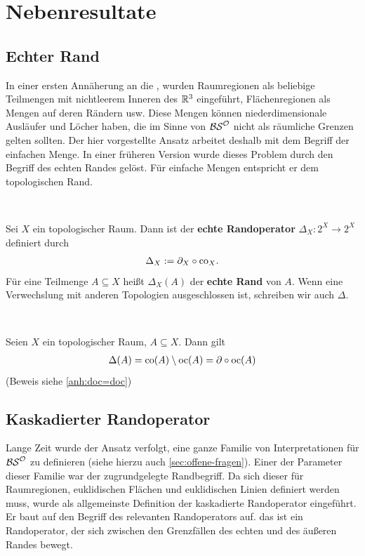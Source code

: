 \chapter{Nebenresultate}\label{chap:nebenresultat}

\section{Echter Rand}
    In einer ersten Annäherung an die \strukt, wurden Raumregionen als beliebige Teilmengen mit nichtleerem Inneren des $\mathbb{R}^3$ eingeführt, Flächenregionen als Mengen auf deren Rändern usw.
    Diese Mengen können niederdimensionale Ausläufer und Löcher haben, die im Sinne von $\mathcal{BS}^{\mathcal{O}}$ nicht als räumliche Grenzen gelten sollten. 
    Der hier vorgestellte Ansatz arbeitet deshalb mit dem Begriff der einfachen Menge. 
    In einer früheren Version wurde dieses Problem durch den Begriff des echten Randes gelöst.
    Für einfache Mengen entspricht er dem topologischen Rand.

    \begin{dfn}\label{def:echtR} \ \vspace{8pt}

        \noindent
        Sei $X$ ein topologischer Raum. Dann ist der \textbf{echte Randoperator} $\Delta_X : 2^X \to 2^X$ definiert durch
        \begin{align}
            \Delta_X := \partial_X \circ \text{co}_X.
        \end{align}
        Für eine Teilmenge $A \subseteq X$ heißt $\Delta_X(A)$ der \textbf{echte Rand} von $A$. Wenn eine Verwechslung mit anderen Topologien ausgeschlossen ist, schreiben wir auch $\Delta$.
        
    \end{dfn}

    \begin{satz} \label{satz:dco=doc} \ \vspace{8pt}

        \noindent
        Seien $X$ ein topologischer Raum, $A \subseteq X$. Dann gilt
        \begin{align*}
            \Delta(A) = \text{co}(A) \setminus \text{oc}(A) = \partial \circ \text{oc}(A)
        \end{align*}
        (Beweis siehe \ref{anh:doc=doc})
    \end{satz}
    
    
\section{Kaskadierter Randoperator}\label{sec:kaskadierter-ro}
    Lange Zeit wurde der Ansatz verfolgt, eine ganze Familie von Interpretationen für $\mathcal{BS}^{\mathcal{O}}$ zu definieren (siehe hierzu auch \ref{sec:offene-fragen}).
    Einer der Parameter dieser Familie war der zugrundgelegte Randbegriff.
    Da sich dieser für Raumregionen, euklidischen Flächen und euklidischen Linien definiert werden muss, wurde als allgemeinste Definition der kaskadierte Randoperator eingeführt.
    Er baut auf den Begriff des relevanten Randoperators auf.
    das ist ein Randoperator, der sich zwischen den Grenzfällen des echten und des äußeren Randes bewegt.
    
